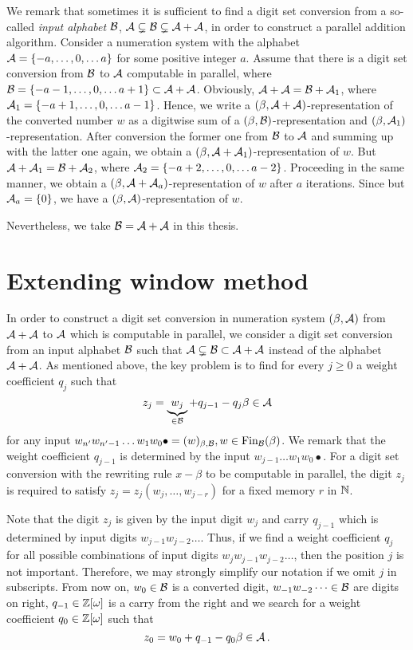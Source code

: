   We remark that sometimes it is sufficient to find a digit set conversion from a so-called \emph{input alphabet} $\mathcal{B}$, $\mathcal{A} \subsetneq \mathcal{B} \subsetneq \mathcal{A}+\mathcal{A}$, in order to construct a parallel addition algorithm. Consider a numeration system with the alphabet $\mathcal{A}=\{-a, \dots, 0, \dots a\}$ for some positive integer $a$. Assume that there is a digit set conversion from $\mathcal{B}$ to $\mathcal{A}$ computable in parallel, where $\mathcal{B}=\{-a-1, \dots, 0, \dots a+1\}\subset\mathcal{A}+\mathcal{A}$. Obviously, $\mathcal{A}+\mathcal{A}=\mathcal{B} + \mathcal{A}_1$, where $\mathcal{A}_1=\{-a+1, \dots, 0, \dots a-1\}$. Hence, we write a $(\beta, \mathcal{A}+\mathcal{A})$-representation of the converted number $w$ as a digitwise sum of a $(\beta, \mathcal{B})$-representation and $(\beta, \mathcal{A}_1)$-representation. After conversion the former one from $\mathcal{B}$ to $\mathcal{A}$ and summing up with the latter one again, we obtain a  $(\beta, \mathcal{A}+\mathcal{A}_1)$-representation of $w$. But $\mathcal{A}+\mathcal{A}_1=\mathcal{B} + \mathcal{A}_2$, where $\mathcal{A}_2=\{-a+2, \dots, 0, \dots a-2\}$. Proceeding in the same manner, we  obtain a  $(\beta, \mathcal{A}+\mathcal{A}_a)$-representation of $w$ after $a$ iterations. Since but $\mathcal{A}_a=\{0\}$, we have a $(\beta, \mathcal{A})$-representation of $w$. 
  
  Nevertheless, we take $\mathcal{B}=\mathcal{A}+\mathcal{A}$ in this thesis.

\section{Extending window method}
\label{sec:methodDescription}
In order to construct a digit set conversion in numeration system $(\beta,\mathcal{A})$ from $\mathcal{A}+\mathcal{A}$ to $\mathcal{A}$ which is computable in parallel, we consider a digit set conversion from an input alphabet $\mathcal{B}$ such that $\mathcal{A} \subsetneq \mathcal{B} \subset \mathcal{A}+\mathcal{A}$ instead of the alphabet $\mathcal{A}+\mathcal{A}$.
As mentioned above, the key problem is to find for every $j\geq 0$ a weight coefficient $q_j$ such that 
    $$
        z_j=\underbrace{w_j}_{\in \mathcal{B}} + q_{j-1} - q_j \beta \in \mathcal{A} 
    $$  
    for any input $w_{n'}w_{n'-1}\dots w_1 w_0 \bullet=(w)_{\beta,\mathcal{B}}, w\in \text{Fin}_{\mathcal{B}}(\beta)$. We remark that the weight coefficient $q_{j-1}$ is determined by the input $w_{j-1}\dots w_1 w_0 \bullet$. For a digit set conversion with the rewriting rule $x-\beta$ to be computable in parallel, the digit $z_j$ is required to satisfy $z_j=z_j(w_{j},\dots,w_{j-r})$ for a fixed memory $r$ in $\mathbb{N}$.
    
    Note that the digit $z_j$ is given by the input digit $w_j$ and carry $q_{j-1}$ which is determined by input digits  $w_{j-1} w_{j-2}\dots$. Thus, if we find a weight coefficient $q_j$ for all possible combinations of input digits $w_j w_{j-1} w_{j-2}\dots$, then the position $j$ is not important. Therefore, we may strongly simplify our notation if we omit $j$ in subscripts. From now on, $w_0\in\mathcal{B}$ is a converted digit, $w_{-1} w_{-2}\dots\in\mathcal{B}$ are digits on right, $q_{-1}\in\mathbb{Z}[\omega]$ is a carry from the right and we search for a weight coefficient $q_0\in\mathbb{Z}[\omega]$ such that 
    $$
    z_0=w_0 + q_{-1} - q_0 \beta \in \mathcal{A}\,.
    $$
    

